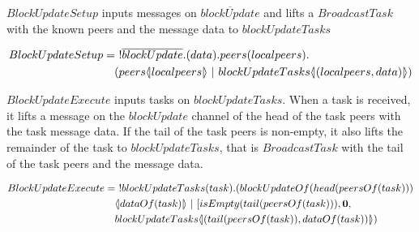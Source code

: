 $BlockUpdateSetup$ inputs messages on $\overline{blockUpdate}$ and lifts a $BroadcastTask$ with the known peers and the message data to $blockUpdateTasks$

\begin{align*}
    BlockUpdateSetup &=\ !\overline{blockUpdate}.(data).peers(localpeers).\\
    &\quad (peers\lift{}{localpeers}\ |\ blockUpdateTasks\lift{}{(localpeers,data)})
\end{align*}

$BlockUpdateExecute$ inputs tasks on $blockUpdateTasks$. When a task is received, it lifts a message on the $blockUpdate$ channel of the head of the task peers with the task message data. If the tail of the task peers is non-empty, it also lifts the remainder of the task to $blockUpdateTasks$, that is $BroadcastTask$ with the tail of the task peers and the message data.

\begin{align*}
    BlockUpdateExecute &=\ !blockUpdateTasks(task).(blockUpdateOf(head(peersOf(task)))\\
    &\quad \lift{}{dataOf(task)}\ |\ [isEmpty(tail(peersOf(task))),\nil,\\
    &\quad blockUpdateTasks\lift{}{(tail(peersOf(task)),dataOf(task))})
\end{align*}
